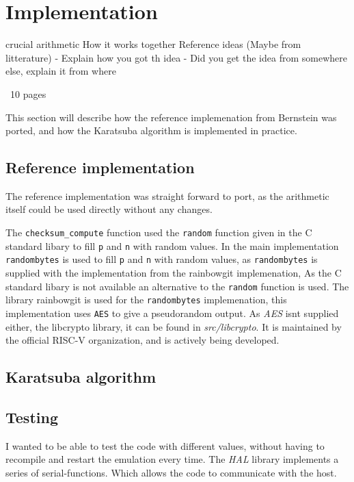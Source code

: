 \section{Implementation}
    crucial arithmetic
    How it works together
    Reference ideas (Maybe from litterature)
    - Explain how you got th idea
    - Did you get the idea from somewhere else, explain it from where

~10 pages

This section will describe how the reference implemenation from Bernstein was ported, and how the Karatsuba algorithm is implemented in practice.
\subsection{Reference implementation}
The reference implementation was straight forward to port, as the arithmetic itself could be used directly without any changes.


The \texttt{checksum\_compute} function used the \texttt{random\(\)} function given in the C standard libary to fill \texttt{p} and \texttt{n} with random values. In the main implementation \texttt{randombytes\(\)} is used to fill \texttt{p} and \texttt{n} with random values, as \texttt{randombytes\(\)} is supplied with the implementation from the rainbowgit implemenation\cite{rainbowgit}, 
As the C standard libary is not available an alternative to the \texttt{random\(\)} function is used. The library rainbowgit\cite{rainbowgit} is used for the \texttt{randombytes\(\)} implemenation, this implementation uses \texttt{AES} to give a pseudorandom output. As \textit{AES} isnt supplied either, the libcrypto library\cite{libcrypto}, it can be found in \textit{src/libcrypto}. It is maintained by the official RISC-V organization, and is actively being developed.



\subsection{Karatsuba algorithm}


\subsection{Testing}
I wanted to be able to test the code with different values, without having to recompile and restart the emulation every time. The \textit{HAL} library implements a series of serial-functions. Which allows the code to communicate with the host.
